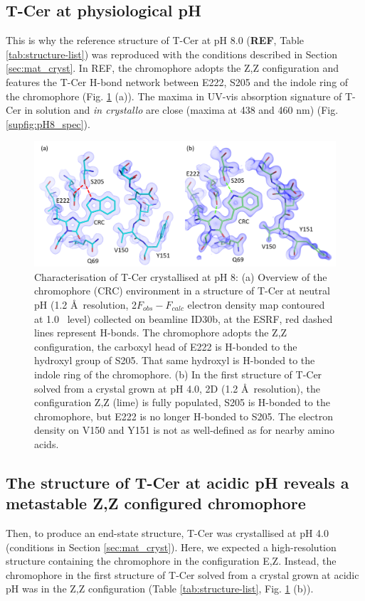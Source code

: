 \subsection{T-Cer at physiological pH}
This is why the reference structure of T-Cer at pH 8.0 (\textbf{REF}, Table \ref{tab:structure-list}) was reproduced with the conditions described in Section \ref{sec:mat_cryst}. In REF, the chromophore adopts the Z,Z configuration and features the T-Cer H-bond network between E222, S205 and the indole ring of the chromophore (Fig. \ref{fig:T-Cer_pH8vs4} (a)). The maxima in UV-vis absorption signature of T-Cer in solution and \textit{in crystallo} are close (maxima at 438 and 460 nm) (Fig. \ref{supfig:pH8_spec}).
\begin{figure}[H] %
    \centering
        \noindent \includegraphics[width=\textwidth]{images/T-Cer/T-Cer_pH8vs4.png}
    \hfill
    \caption{Characterisation of T-Cer crystallised at pH 8: (a) Overview of the chromophore (CRC) environment in a structure of T-Cer at neutral pH (1.2 \AA\  resolution, 2\(F_{obs} - F_{calc}\) electron density map contoured at 1.0 \textsigma\ level) collected on beamline ID30b, at the ESRF, red dashed lines represent H-bonds. The chromophore adopts the Z,Z configuration, the carboxyl head of E222 is H-bonded to the hydroxyl group of S205. That same hydroxyl is H-bonded to the indole ring of the chromophore. (b) In the first structure of T-Cer solved from a crystal grown at pH 4.0, 2D (1.2 \AA\ resolution), the configuration Z,Z (lime) is fully populated, S205 is H-bonded to the chromophore, but E222 is no longer H-bonded to S205. The electron density on V150 and Y151 is not as well-defined as for nearby amino acids.}
    \label{fig:T-Cer_pH8vs4}
\end{figure}
\subsection{The structure of T-Cer at acidic pH reveals a metastable Z,Z configured chromophore}
Then, to produce an end-state structure, T-Cer was crystallised at pH 4.0 (conditions in Section \ref{sec:mat_cryst}). Here, we expected a high-resolution structure containing the chromophore in the configuration E,Z. Instead, the chromophore in the first structure of T-Cer solved from a crystal grown at acidic pH was in the Z,Z configuration (Table \ref{tab:structure-list}, Fig. \ref{fig:T-Cer_pH8vs4} (b)). 


